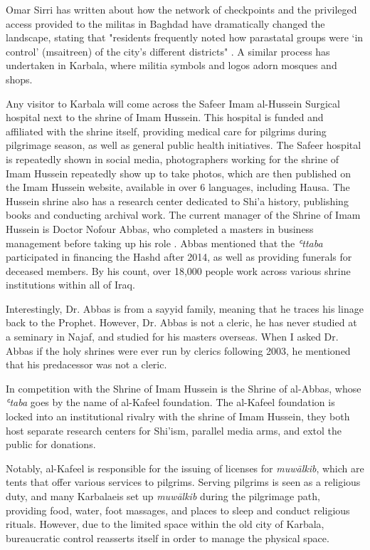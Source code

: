 Omar Sirri has written about how the network of checkpoints and the privileged access provided to the militas in Baghdad have dramatically changed the landscape, stating that "residents frequently noted how parastatal groups were ‘in control’ (msaitreen) of the city’s different districts" \cite[14]{omar_sirri_destructive_2021}. A similar process has undertaken in Karbala, where militia symbols and logos adorn mosques and shops. 

Any visitor to Karbala will come across the Safeer Imam al-Hussein Surgical hospital next to the shrine of Imam Hussein. This hospital is funded and affiliated with the shrine itself, providing medical care for pilgrims during pilgrimage season, as well as general public health initiatives. The Safeer hospital is repeatedly shown in social media, photographers working for the shrine of Imam Hussein repeatedly show up to take photos, which are then published on the Imam Hussein website, available in over 6 languages, including Hausa. The Hussein shrine also has a research center dedicated to Shi'a history, publishing books and conducting archival work. The current manager of the Shrine of Imam Hussein is Doctor Nofour Abbas, who completed a masters in business management before taking up his role \cite{nofour_abbas_interview_2021}. Abbas mentioned that the \emph{ʿttaba} participated in financing the Hashd after 2014, as well as providing funerals for deceased members. By his count, over 18,000 people work across various shrine institutions within all of Iraq. 

Interestingly, Dr. Abbas is from a sayyid family, meaning that he traces his linage back to the Prophet. However, Dr. Abbas is not a cleric, he has never studied at a seminary in Najaf, and studied for his masters overseas. When I asked Dr. Abbas if the holy shrines were ever run by clerics following 2003, he mentioned that his predacessor was not a cleric. 

In competition with the Shrine of Imam Hussein is the Shrine of al-Abbas, whose \emph{ʿtaba} goes by the name of al-Kafeel foundation. The al-Kafeel foundation is locked into an institutional rivalry with the shrine of Imam Hussein, they both host separate research centers for Shi'ism, parallel media arms, and extol the public for donations. 

Notably, al-Kafeel is responsible for the issuing of licenses for \emph{muwālkib}, which are tents that offer various services to pilgrims. Serving pilgrims is seen as a religious duty, and many Karbalaeis set up \emph{muwālkib} during the pilgrimage path, providing food, water, foot massages, and places to sleep and conduct religious rituals. However, due to the limited space within the old city of Karbala, bureaucratic control reasserts itself in order to manage the physical space. 

